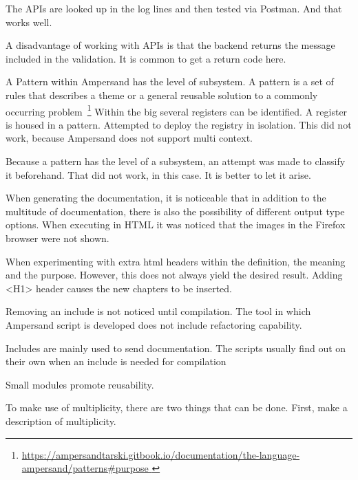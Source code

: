 The APIs are looked up in the log lines and then tested via Postman.
And that works well.

A disadvantage of working with APIs is that the backend returns the message included in the validation.
It is common to get a return code here.

A Pattern within Ampersand has the level of subsystem.
A pattern is a set of rules that describes a theme or a general reusable solution to a commonly occurring problem~\footnote{\url{https://ampersandtarski.gitbook.io/documentation/the-language-ampersand/patterns\#purpose }}
Within the \acrshort{big} several registers can be identified.
A register is housed in a pattern.
Attempted to deploy the registry in isolation.
This did not work, because Ampersand does not support multi context.

Because a pattern has the level of a subsystem, an attempt was made to classify it beforehand.
That did not work, in this case.
It is better to let it arise.

When generating the documentation, it is noticeable that in addition to the multitude of documentation, there is also the possibility of different output type options.
When executing in HTML it was noticed that the images in the Firefox browser were not shown.

When experimenting with extra html headers within the definition, the meaning and the purpose.
However, this does not always yield the desired result.
Adding <H1> header causes the new chapters to be inserted.

Removing an include is not noticed until compilation.
The tool in which Ampersand script is developed does not include refactoring capability.

Includes are mainly used to send documentation.
The scripts usually find out on their own when an include is needed for compilation

Small modules promote reusability.


To make use of multiplicity, there are two things that can be done.
First, make a description of multiplicity.

